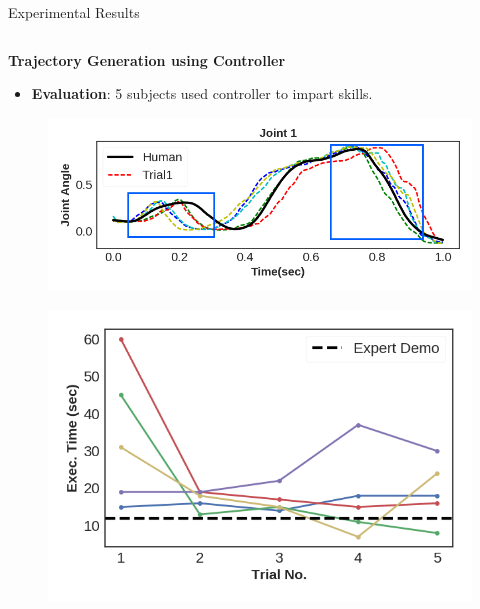 \documentclass[final,hyperref={pdfpagelabels=false}]{beamer}
\begin{document}
\begin{frame}[t]
\begin{columns}[t]
\begin{column}{0.96\linewidth}
\begin{alertblock}{Experimental Results}
\begin{columns}[t]
                    \begin{column}{0.33\textwidth}
                        \centering \textbf{Trajectory Generation using Controller}
                        \begin{itemize}
                            \item \textbf{Evaluation}: 5 subjects used controller to impart skills.
                        \end{itemize}
                        \begin{figure}
                            \centering
                            \includegraphics[width=\textwidth]{controllerVar}
                        \end{figure}
                        \vspace*{-1cm}
                        \begin{figure}
                            \centering
                            \includegraphics[width=\textwidth, height=0.15\textheight]{controllerTime}
                        \end{figure}
                    \end{column}


\end{columns}
\end{alertblock}
\end{column}
\end{columns}
\end{frame}
\end{document}
